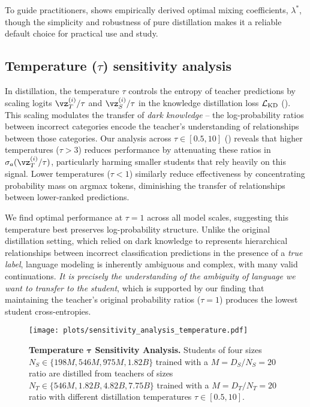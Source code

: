 To guide practitioners,  shows empirically derived optimal mixing coefficients, $\lambda^*$, though the simplicity and robustness of pure distillation makes it a reliable default choice for practical use and study.



\subsection{Temperature (\texorpdfstring{$\tau$}{tau}) sensitivity analysis}
\label{ssec:temperature-tau-sensitivity}
In distillation, the temperature $\tau$ controls the entropy of teacher predictions by scaling logits 
$\vz_T^{(i)}/\tau$ and $\vz_S^{(i)}/\tau$ in the knowledge distillation loss $\mathcal{L}_{\text{KD}}$ (). 
This scaling modulates the transfer of
\emph{dark knowledge} \citep{DBLP:journals/corr/HintonVD15} -- the log-probability ratios between incorrect categories encode the teacher's understanding of relationships between those categories.
Our analysis across $\tau \in [0.5,10]$ () reveals that higher temperatures ($\tau > 3$) reduces performance by attenuating these ratios in $\sigma_a(\vz_T^{(i)}/\tau)$, particularly harming smaller students that rely heavily on this signal. Lower temperatures ($\tau < 1$) similarly reduce effectiveness by concentrating probability mass on argmax tokens, diminishing the transfer of relationships between lower-ranked predictions. 

We find optimal performance at $\tau=1$ across all model scales, suggesting this temperature best preserves log-probability structure.
Unlike the original distillation setting, 
which relied on dark knowledge to represents hierarchical relationships between incorrect classification predictions
in the presence of a \emph{true label},
language modeling is inherently ambiguous and complex, with many valid continuations.
\emph{It is precisely the understanding of the ambiguity of language we want to transfer to the student}, which is supported by our finding that maintaining the teacher's original probability ratios ($\tau=1$) produces the lowest student cross-entropies.
\begin{figure}[h]
	\centering
	\texttt{[image: plots/sensitivity\_analysis\_temperature.pdf]}
	\caption{\textbf{Temperature $\bm \tau$ Sensitivity Analysis.} Students of four sizes $N_S\in\{198M,546M,975M,1.82B\}$ trained with a $M=D_S/N_S=20$ ratio are distilled from teachers of sizes $N_T\in\{546M, 1.82B,4.82B,7.75B\}$ trained with a $M=D_T/N_T=20$ ratio with different distillation temperatures $\tau\in[0.5,10]$.
	}
	\label{fig:sensitivity-analysis-temperature}
\end{figure}


